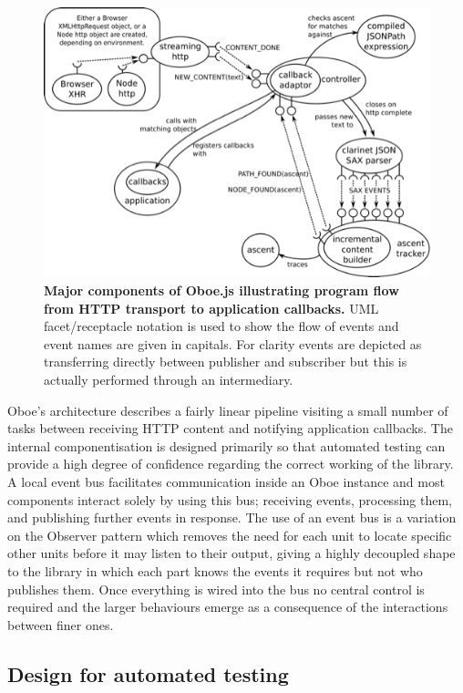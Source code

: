 \documentclass[12pt, ]{article}
\makeatletter
\def\maxwidth{\ifdim\Gin@nat@width>\linewidth\linewidth
\else\Gin@nat@width\fi}
\let\Oldincludegraphics\includegraphics
\renewcommand{\includegraphics}[1]{\Oldincludegraphics[width=\maxwidth]{#1}}
\makeatother
\begin{document}
\begin{figure}[htbp]
\centering
\includegraphics{images/overallDesign.png}
\caption{\textbf{Major components of Oboe.js illustrating program flow
from HTTP transport to application callbacks.} UML facet/receptacle
notation is used to show the flow of events and event names are given in
capitals. For clarity events are depicted as transferring directly
between publisher and subscriber but this is actually performed through
an intermediary. \label{overallDesign}}
\end{figure}

Oboe's architecture describes a fairly linear pipeline visiting a small
number of tasks between receiving HTTP content and notifying application
callbacks. The internal componentisation is designed primarily so that
automated testing can provide a high degree of confidence regarding the
correct working of the library. A local event bus facilitates
communication inside an Oboe instance and most components interact
solely by using this bus; receiving events, processing them, and
publishing further events in response. The use of an event bus is a
variation on the Observer pattern which removes the need for each unit
to locate specific other units before it may listen to their output,
giving a highly decoupled shape to the library in which each part knows
the events it requires but not who publishes them. Once everything is
wired into the bus no central control is required and the larger
behaviours emerge as a consequence of the interactions between finer
ones.

\subsection{Design for automated
testing}\label{design-for-automated-testing}
\end{document}
